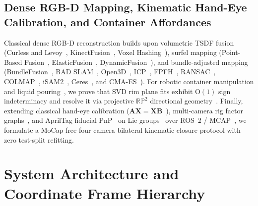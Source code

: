 \documentclass[10pt,journal]{IEEEtran}
\begin{document}
\subsection{Dense RGB-D Mapping, Kinematic Hand-Eye Calibration, and Container Affordances}
Classical dense RGB-D reconstruction builds upon volumetric TSDF fusion (Curless and Levoy~\cite{curless1996volumetric}, KinectFusion~\cite{newcombe2011kinectfusion,izadi2011kinectfusion}, Voxel Hashing~\cite{niessner2013voxel}), surfel mapping (Point-Based Fusion~\cite{keller2013point}, ElasticFusion~\cite{whelan2015elasticfusion}, DynamicFusion~\cite{newcombe2015dynamicfusion}), and bundle-adjusted mapping (BundleFusion~\cite{dai2017bundlefusion}, BAD SLAM~\cite{schops2019badslam}, Open3D~\cite{zhou2018open3d}, ICP~\cite{besl1992icp}, FPFH~\cite{rusu2009fpfh}, RANSAC~\cite{fischler1981ransac}, COLMAP~\cite{schonberger2016sfm}, iSAM2~\cite{kaess2012isam2}, Ceres~\cite{agarwal2022ceres}, and CMA-ES~\cite{hansen2001cmaes}). For robotic container manipulation and liquid pouring~\cite{manuelli2019kpam,qin2020keto,florence2018dense,pan2022tax,pan2016robot,schenck2017visual,kennedy2019autonomous}, we prove that SVD rim plane fits exhibit $\mathrm{O}(1)$ sign indeterminacy and resolve it via projective $\mathbb{RP}^2$ directional geometry~\cite{hartley2004mvg,mardia2000directional,taubin1991estimation}. Finally, extending classical hand-eye calibration ($\mathbf{A}\mathbf{X}=\mathbf{X}\mathbf{B}$~\cite{tsai1989new,park1994robot,horaud1995hand,daniilidis1999hand,andreff1999online}), multi-camera rig factor graphs~\cite{shah2019calibration,pretto2023eomp,pachtrachai2018handeye,kalib2024,jcr2024,kcba2026}, and AprilTag fiducial PnP~\cite{olson2011apriltag,wang2016apriltag2,krogius2019apriltag3,collins2014ippe} on Lie groups~\cite{sola2018micro,barfoot2017state,huber1964robust} over ROS~2 / MCAP~\cite{macenski2022ros2,foxglove2022mcap}, we formulate a MoCap-free four-camera bilateral kinematic closure protocol with zero test-split refitting.

\section{System Architecture and Coordinate Frame Hierarchy}
\label{sec:architecture}
\end{document}
